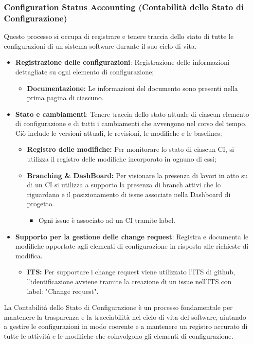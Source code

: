 \documentclass{article}
\begin{document}
\subsubsection{Configuration Status Accounting (Contabilità dello Stato di Configurazione)}
Questo processo si occupa di registrare e tenere traccia dello stato di tutte le configurazioni di un sistema software durante il suo ciclo di vita.
\begin{itemize}
    \item \textbf{Registrazione delle configurazioni}: Registrazione delle informazioni dettagliate su ogni elemento di configurazione;
            \begin{itemize}
                \item  \textbf{Documentazione:} Le informazioni del documento sono presenti nella prima pagina di ciascuno.
            \end{itemize}
    \item \textbf{Stato e cambiamenti}: Tenere traccia dello stato attuale di ciascun elemento di configurazione e di tutti i cambiamenti che avvengono nel corso del tempo. Ciò include le versioni attuali, le revisioni, le modifiche e le baselines;
    \begin{itemize}
        \item  \textbf{Registro delle modifiche:} Per monitorare lo stato di ciascun CI, si utilizza il registro delle modifiche incorporato in ognuno di essi;
        \item  \textbf{Branching \& DashBoard:} Per visionare la presenza di lavori in atto su di un CI si utilizza a supporto la presenza di branch attivi che lo riguardano e il posizionamento di issue associate nella Dashboard di progetto.
        \begin{itemize}
            \item Ogni issue è associato ad un CI tramite label.  \label{sec:ticketing} 
        \end{itemize} 
    \end{itemize}
    \item \textbf{Supporto per la gestione delle change request}: Registra e documenta le modifiche apportate agli elementi di configurazione in risposta alle richieste di modifica.
    \begin{itemize}
        \item  \textbf{ITS:} Per supportare i change request viene utilizzato l'ITS di github, l'identificazione avviene tramite la creazione di un issue nell'ITS con label: "Change request".
    \end{itemize}
\end{itemize}
La Contabilità dello Stato di Configurazione è un processo fondamentale per mantenere la trasparenza e la tracciabilità nel ciclo di vita del software, aiutando a gestire le configurazioni in modo coerente e a mantenere un registro accurato di tutte le attività e le modifiche che coinvolgono gli elementi di configurazione.\\
\vspace{0.2cm}
\end{document}
